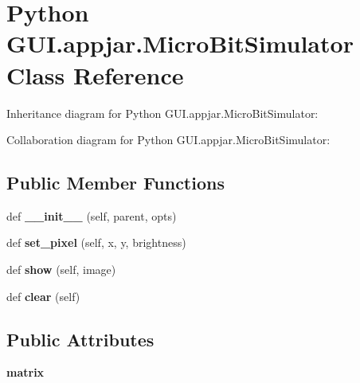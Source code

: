 \hypertarget{class_python_01_g_u_i_1_1appjar_1_1_micro_bit_simulator}{}\section{Python G\+U\+I.\+appjar.\+Micro\+Bit\+Simulator Class Reference}
\label{class_python_01_g_u_i_1_1appjar_1_1_micro_bit_simulator}


Inheritance diagram for Python G\+U\+I.\+appjar.\+Micro\+Bit\+Simulator\+:


Collaboration diagram for Python G\+U\+I.\+appjar.\+Micro\+Bit\+Simulator\+:
\subsection*{Public Member Functions}
\begin{DoxyCompactItemize}
\item 
\mbox{\label{class_python_01_g_u_i_1_1appjar_1_1_micro_bit_simulator_aee696aea10e6390c97903177eae457e6}} 
def {\bfseries \+\_\+\+\_\+init\+\_\+\+\_\+} (self, parent, opts)
\item 
\mbox{\label{class_python_01_g_u_i_1_1appjar_1_1_micro_bit_simulator_a27043f09ca7b57f0979982202df1e265}} 
def {\bfseries set\+\_\+pixel} (self, x, y, brightness)
\item 
\mbox{\label{class_python_01_g_u_i_1_1appjar_1_1_micro_bit_simulator_a8fb25df6862b92caf241b8ebd6c7764f}} 
def {\bfseries show} (self, image)
\item 
\mbox{\label{class_python_01_g_u_i_1_1appjar_1_1_micro_bit_simulator_a0aae252e7f62b00688f077c20573f73c}} 
def {\bfseries clear} (self)
\end{DoxyCompactItemize}
\subsection*{Public Attributes}
\begin{DoxyCompactItemize}
\item 
\mbox{\label{class_python_01_g_u_i_1_1appjar_1_1_micro_bit_simulator_a3eb8e7d3c67960b5b6e6e7ccfe05f1fb}} 
{\bfseries matrix}
\end{DoxyCompactItemize}
